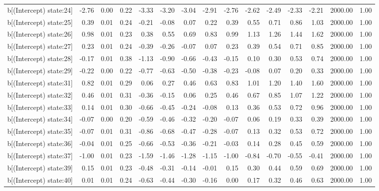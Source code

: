 \begin{table}[ht]
\begin{tabular}{rrrrrrrrrrrrrrr}
  b[(Intercept) state:24] & -2.76 & 0.00 & 0.22 & -3.33 & -3.20 & -3.04 & -2.91 & -2.76 & -2.62 & -2.49 & -2.33 & -2.21 & 2000.00 & 1.00 \\ 
  b[(Intercept) state:25] & 0.39 & 0.01 & 0.24 & -0.21 & -0.08 & 0.07 & 0.22 & 0.39 & 0.55 & 0.71 & 0.86 & 1.03 & 2000.00 & 1.00 \\ 
  b[(Intercept) state:26] & 0.98 & 0.01 & 0.23 & 0.38 & 0.55 & 0.69 & 0.83 & 0.99 & 1.13 & 1.26 & 1.44 & 1.62 & 2000.00 & 1.00 \\ 
  b[(Intercept) state:27] & 0.23 & 0.01 & 0.24 & -0.39 & -0.26 & -0.07 & 0.07 & 0.23 & 0.39 & 0.54 & 0.71 & 0.85 & 2000.00 & 1.00 \\ 
  b[(Intercept) state:28] & -0.17 & 0.01 & 0.38 & -1.13 & -0.90 & -0.66 & -0.43 & -0.15 & 0.10 & 0.30 & 0.53 & 0.74 & 2000.00 & 1.00 \\ 
  b[(Intercept) state:29] & -0.22 & 0.00 & 0.22 & -0.77 & -0.63 & -0.50 & -0.38 & -0.23 & -0.08 & 0.07 & 0.20 & 0.33 & 2000.00 & 1.00 \\ 
  b[(Intercept) state:31] & 0.82 & 0.01 & 0.29 & 0.06 & 0.27 & 0.46 & 0.63 & 0.83 & 1.01 & 1.20 & 1.40 & 1.60 & 2000.00 & 1.00 \\ 
  b[(Intercept) state:32] & 0.46 & 0.01 & 0.31 & -0.36 & -0.15 & 0.06 & 0.25 & 0.46 & 0.67 & 0.85 & 1.07 & 1.22 & 2000.00 & 1.00 \\ 
  b[(Intercept) state:33] & 0.14 & 0.01 & 0.30 & -0.66 & -0.45 & -0.24 & -0.08 & 0.13 & 0.36 & 0.53 & 0.72 & 0.96 & 2000.00 & 1.00 \\ 
  b[(Intercept) state:34] & -0.07 & 0.00 & 0.20 & -0.59 & -0.46 & -0.32 & -0.20 & -0.07 & 0.06 & 0.19 & 0.33 & 0.39 & 2000.00 & 1.00 \\ 
  b[(Intercept) state:35] & -0.07 & 0.01 & 0.31 & -0.86 & -0.68 & -0.47 & -0.28 & -0.07 & 0.13 & 0.32 & 0.53 & 0.72 & 2000.00 & 1.00 \\ 
  b[(Intercept) state:36] & -0.04 & 0.01 & 0.25 & -0.66 & -0.53 & -0.36 & -0.21 & -0.03 & 0.14 & 0.28 & 0.45 & 0.59 & 2000.00 & 1.00 \\ 
  b[(Intercept) state:37] & -1.00 & 0.01 & 0.23 & -1.59 & -1.46 & -1.28 & -1.15 & -1.00 & -0.84 & -0.70 & -0.55 & -0.41 & 2000.00 & 1.00 \\ 
  b[(Intercept) state:39] & 0.15 & 0.01 & 0.23 & -0.48 & -0.31 & -0.14 & -0.01 & 0.15 & 0.30 & 0.44 & 0.59 & 0.69 & 2000.00 & 1.00 \\ 
  b[(Intercept) state:40] & 0.01 & 0.01 & 0.24 & -0.63 & -0.44 & -0.30 & -0.16 & 0.00 & 0.17 & 0.32 & 0.46 & 0.63 & 2000.00 & 1.00 \\ 

\end{tabular}
\end{table}
